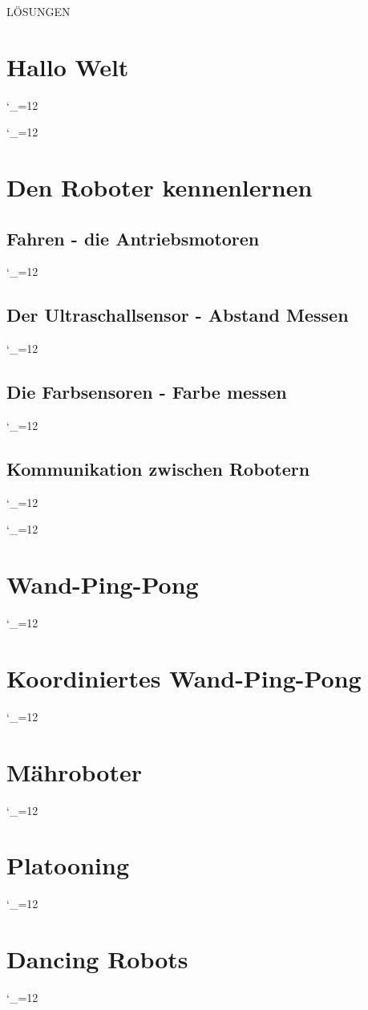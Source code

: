 \documentclass[
	12pt,
	article,
	type=bsc, %
	colorbacktitle,
	instlogo,
	accentcolor=tud1c,
	draft,
	german,
	solution,
	twoside
]{tudexercise}
\newcommand{\solpath}[0]{../../impl/androidApp/app/src/main/java/org/mindroid/android/app/programs/workshop/solutions}
\newcommand{\sol}{\begingroup
  \catcode`_=12 \docodelst}
\newcommand{\docodelst}[1]{
  	
  \endgroup
}
\begin{document}
	
	
	\centering	
	\bigskip\bigskip\bigskip\bigskip\bigskip\bigskip\bigskip\bigskip\bigskip	
	{\Huge LÖSUNGEN}
	
	\newpage
	\section{Hallo Welt}
	\sol{HelloWorld}
	\sol{HelloDate}
	
	\newpage
	\section{Den Roboter kennenlernen}	
		\subsection{Fahren - die Antriebsmotoren}	
			\sol{DriveSquare}
		
		\newpage	
		\subsection{Der Ultraschallsensor - Abstand Messen}	
			\sol{ParkingSensor}	
		
		\newpage	
		\subsection{Die Farbsensoren - Farbe messen}
			\sol{ColourTest}
		
		\newpage	
		\subsection{Kommunikation zwischen Robotern}
			\sol{HelloWorldPingB}
			\sol{HelloWorldPingR}
	
	\newpage
	\section{Wand-Ping-Pong}
		\sol{ImpSingleWallPingPong}
	
	\newpage	
	\section{Koordiniertes Wand-Ping-Pong}
		\sol{ImpCoordWallPingPong}
		
	\newpage	
	\section{Mähroboter}
		\sol{LawnMower}
	
	\newpage
	\section{Platooning}
		\sol{Platooning}

	\section{Dancing Robots}
		\sol{Follow}
	
\end{document}

